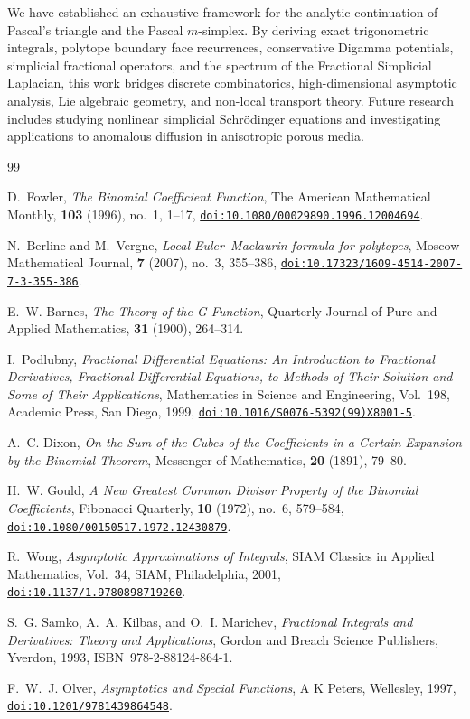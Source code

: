 \documentclass[11pt,a4paper]{article}
\theoremstyle{plain}
\theoremstyle{definition}
\theoremstyle{remark}
\numberwithin{equation}{section}
\providecommand{\doi}[1]{\href{https://doi.org/#1}{\texttt{doi:#1}}}
\begin{document}
We have established an exhaustive framework for the analytic continuation of Pascal's triangle and the Pascal $m$-simplex. By deriving exact trigonometric integrals, polytope boundary face recurrences, conservative Digamma potentials, simplicial fractional operators, and the spectrum of the Fractional Simplicial Laplacian, this work bridges discrete combinatorics, high-dimensional asymptotic analysis, Lie algebraic geometry, and non-local transport theory. Future research includes studying nonlinear simplicial Schrödinger equations and investigating applications to anomalous diffusion in anisotropic porous media.

\begin{thebibliography}{99}

D.~Fowler,
\emph{The Binomial Coefficient Function},
The American Mathematical Monthly, \textbf{103} (1996), no.~1, 1--17,
\doi{10.1080/00029890.1996.12004694}.

N.~Berline and M.~Vergne,
\emph{Local Euler--Maclaurin formula for polytopes},
Moscow Mathematical Journal, \textbf{7} (2007), no.~3, 355--386,
\doi{10.17323/1609-4514-2007-7-3-355-386}.

E.~W. Barnes,
\emph{The Theory of the G-Function},
Quarterly Journal of Pure and Applied Mathematics, \textbf{31} (1900), 264--314.

I.~Podlubny,
\emph{Fractional Differential Equations: An Introduction to Fractional Derivatives, Fractional Differential Equations, to Methods of Their Solution and Some of Their Applications},
Mathematics in Science and Engineering, Vol.~198, Academic Press, San Diego, 1999,
\doi{10.1016/S0076-5392(99)X8001-5}.

A.~C. Dixon,
\emph{On the Sum of the Cubes of the Coefficients in a Certain Expansion by the Binomial Theorem},
Messenger of Mathematics, \textbf{20} (1891), 79--80.

H.~W. Gould,
\emph{A New Greatest Common Divisor Property of the Binomial Coefficients},
Fibonacci Quarterly, \textbf{10} (1972), no.~6, 579--584,
\doi{10.1080/00150517.1972.12430879}.

R.~Wong,
\emph{Asymptotic Approximations of Integrals},
SIAM Classics in Applied Mathematics, Vol.~34, SIAM, Philadelphia, 2001,
\doi{10.1137/1.9780898719260}.

S.~G. Samko, A.~A. Kilbas, and O.~I. Marichev,
\emph{Fractional Integrals and Derivatives: Theory and Applications},
Gordon and Breach Science Publishers, Yverdon, 1993, ISBN~978-2-88124-864-1.

F.~W.~J. Olver,
\emph{Asymptotics and Special Functions},
A K Peters, Wellesley, 1997,
\doi{10.1201/9781439864548}.

\end{thebibliography}
\end{document}
